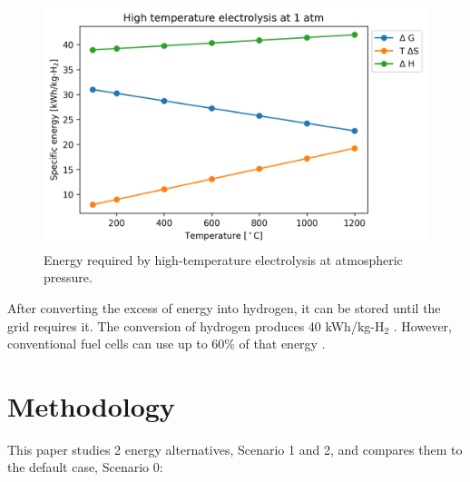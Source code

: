 \documentclass{anstrans}
\begin{document}
\begin{figure}[htbp!] %
    \centering
    \includegraphics[width=0.90\linewidth]{figures/hte-energy}
    \hfill
    \caption{Energy required by high-temperature electrolysis at atmospheric pressure.}
    \label{fig:hte-energy}
\end{figure}

After converting the excess of energy into hydrogen, it can be stored until the grid requires it.
The conversion of hydrogen produces 40 kWh/kg-H$_2$ \cite{ursua_hydrogen_2012}.
However, conventional fuel cells can use up to 60\% of that energy \cite{doe_energy_fuel_2015}.


\section{Methodology}


This paper studies 2 energy alternatives, Scenario 1 and 2, and compares them to the default case, Scenario 0:
\end{document}
